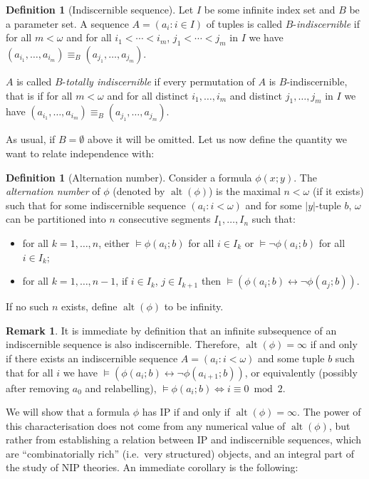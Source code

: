 \documentclass[a4paper]{report}
\newcommand{\ind}{\hspace{15pt}}
\renewcommand{\iff}{\Leftrightarrow}
\newcommand{\siff}{\leftrightarrow}
\DeclareMathOperator{\alt}{alt}
\theoremstyle{definition}
\newtheorem{defn}[thm]{Definition}
\theoremstyle{remstyle}
\newtheorem{rem}[thm]{Remark}
\begin{document}
\begin{defn}[Indiscernible sequence]
	Let $I$ be some infinite index set and $B$ be a parameter set. A sequence $A=(a_i:i\in I)$ of tuples is called $B$-\emph{indiscernible} if for all $m<\omega$ and for all $i_1<\cdots<i_m$, $j_1<\cdots<j_m$ in $I$ we have $(a_{i_1},\ldots,a_{i_m})\equiv_B(a_{j_1},\ldots, a_{j_m})$.

	$A$ is called $B$-\emph{totally indiscernible} if every permutation of $A$ is $B$-indiscernible, that is if for all $m<\omega$ and for all distinct $i_1,\ldots,i_m$ and distinct $j_1,\ldots,j_m$ in $I$ we have $(a_{i_1},\ldots,a_{i_m})\equiv_B(a_{j_1},\ldots, a_{j_m})$.
\end{defn}

\ind As usual, if $B=\emptyset$ above it will be omitted. Let us now define the quantity we want to relate independence with:

\begin{defn}[Alternation number]\label{defalt}
	Consider a formula $\phi(x;y)$. The \emph{alternation number} of $\phi$ (denoted by $\alt(\phi)$) is the maximal $n<\omega$ (if it exists) such that for some indiscernible sequence $(a_i:i<\omega)$ and for some $|y|$-tuple $b$, $\omega$ can be partitioned into $n$ consecutive segments $I_1,\ldots,I_n$ such that:
	\begin{itemize}
		\item for all $k=1,\ldots,n$, either $\models \phi(a_i;b)$ for all $i\in I_k$ or $\models\neg\phi(a_i;b)$ for all $i\in I_k$;
		\item for all $k=1,\ldots,n-1$, if $i\in I_k$, $j\in I_{k+1}$ then $\models (\phi(a_i;b)\siff\neg\phi(a_j;b))$.
	\end{itemize}

	If no such $n$ exists, define $\alt(\phi)$ to be infinity.
\end{defn}

\begin{rem}\label{equivalt}
	It is immediate by definition that an infinite subsequence of an indiscernible sequence is also indiscernible. Therefore, $\alt(\phi)=\infty$ if and only if there exists an indiscernible sequence $A=(a_i:i<\omega)$ and some tuple $b$ such that for all $i$ we have $\models (\phi(a_i;b)\siff\neg\phi(a_{i+1};b))$, or equivalently (possibly after removing $a_0$ and relabelling), $\models \phi(a_i;b)\iff i\equiv 0\bmod 2$.
\end{rem}

\ind We will show that a formula $\phi$ has IP if and only if $\alt(\phi)=\infty$. The power of this characterisation does not come from any numerical value of $\alt(\phi)$, but rather from establishing a relation between IP and indiscernible sequences, which are ``combinatorially rich'' (i.e.\ very structured) objects, and an integral part of the study of NIP theories. An immediate corollary is the following:
\end{document}
